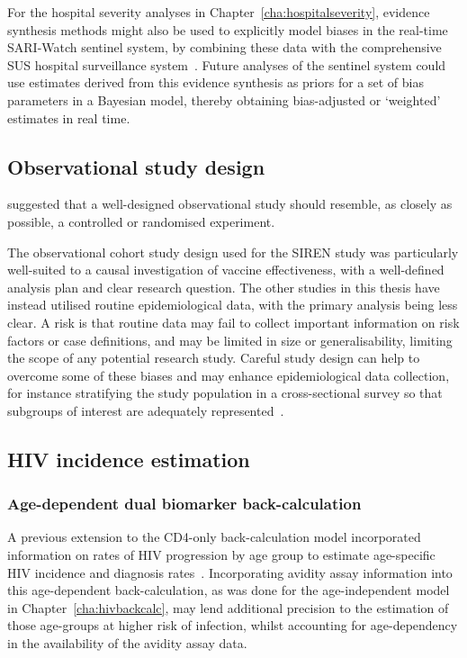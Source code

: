 For the hospital severity analyses in Chapter~\ref{cha:hospitalseverity}, evidence synthesis methods might also be used to explicitly model biases in the real-time SARI-Watch sentinel system, by combining these data with the comprehensive SUS hospital surveillance system~\parencite{De-Angelis2015-uy, Turner2009-bf}. Future analyses of the sentinel system could use estimates derived from this evidence synthesis as priors for a set of bias parameters in a Bayesian model, thereby obtaining bias-adjusted or `weighted' estimates in real time.

\subsection{Observational study design}

\cite{Cochran1965-uh} suggested that a well-designed observational study should resemble, as closely as possible, a controlled or randomised experiment.

The observational cohort study design used for the SIREN study was particularly well-suited to a causal investigation of vaccine effectiveness, with a well-defined analysis plan and clear research question. The other studies in this thesis have instead utilised routine epidemiological data, with the primary analysis being less clear. A risk is that routine data may fail to collect important information on risk factors or case definitions, and may be limited in size or generalisability, limiting the scope of any potential research study. Careful study design can help to overcome some of these biases and may enhance epidemiological data collection, for instance stratifying the study population in a cross-sectional survey so that subgroups of interest are adequately represented~\parencite{Woodward2013-ef}.

\subsection{HIV incidence estimation}

\subsubsection{Age-dependent dual biomarker back-calculation}

A previous extension to the CD4-only back-calculation model incorporated information on rates of HIV progression by age group to estimate age-specific HIV incidence and diagnosis rates~\parencite{Brizzi2019-yj}. Incorporating avidity assay information into this age-dependent back-calculation, as was done for the age-independent model in Chapter~\ref{cha:hivbackcalc}, may lend additional precision to the estimation of those age-groups at higher risk of infection, whilst accounting for age-dependency in the availability of the avidity assay data.

